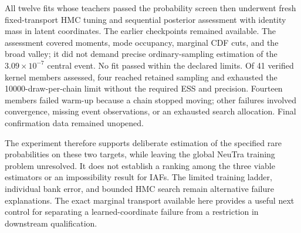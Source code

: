 All twelve fits whose teachers passed the probability screen then underwent
fresh fixed-transport HMC tuning and sequential posterior assessment with
identity mass in latent coordinates. The earlier checkpoints remained
available. The assessment covered moments, mode occupancy, marginal CDF cuts,
and the broad valley; it did not demand precise ordinary-sampling estimation
of the $3.09\times10^{-7}$ central event. No fit passed within the declared
limits. Of 41 verified kernel members assessed, four reached retained
sampling and exhausted the 10000-draw-per-chain limit without the required
ESS and precision. Fourteen members failed warm-up because a chain stopped
moving; other failures involved convergence, missing event observations,
or an exhausted search allocation. Final confirmation data remained unopened.

The experiment therefore supports deliberate estimation of the specified
rare probabilities on these two targets, while leaving the global NeuTra
training problem unresolved. It does not establish a ranking among the three
viable estimators or an impossibility result for IAFs. The limited training
ladder, individual bank error, and bounded HMC search remain alternative
failure explanations. The exact marginal transport available here provides
a useful next control for separating a learned-coordinate failure from a
restriction in downstream qualification.

